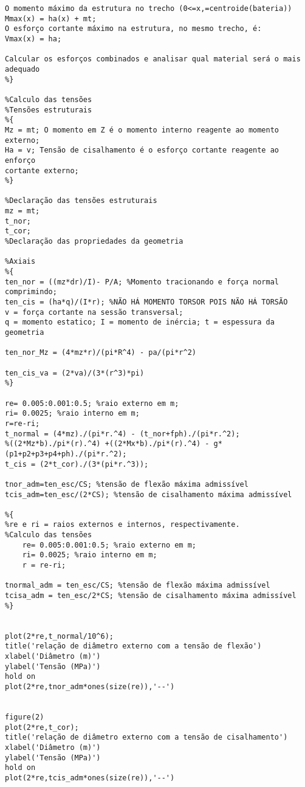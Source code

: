 \begin{anexosenv}
\begin{lstlisting}
O momento máximo da estrutura no trecho (0<=x,=centroide(bateria))
Mmax(x) = ha(x) + mt;
O esforço cortante máximo na estrutura, no mesmo trecho, é:
Vmax(x) = ha;

Calcular os esforços combinados e analisar qual material será o mais
adequado
%}

%Calculo das tensões
%Tensões estruturais
%{
Mz = mt; O momento em Z é o momento interno reagente ao momento externo;
Ha = v; Tensão de cisalhamento é o esforço cortante reagente ao enforço
cortante externo;
%}

%Declaração das tensões estruturais
mz = mt;
t_nor;
t_cor;
%Declaração das propriedades da geometria

%Axiais 
%{
ten_nor = ((mz*dr)/I)- P/A; %Momento tracionando e força normal comprimindo;
ten_cis = (ha*q)/(I*r); %NÃO HÁ MOMENTO TORSOR POIS NÃO HÁ TORSÃO
v = força cortante na sessão transversal;
q = momento estatico; I = momento de inércia; t = espessura da geometria

ten_nor_Mz = (4*mz*r)/(pi*R^4) - pa/(pi*r^2)

ten_cis_va = (2*va)/(3*(r^3)*pi)
%} 

re= 0.005:0.001:0.5; %raio externo em m;
ri= 0.0025; %raio interno em m;
r=re-ri;
t_normal = (4*mz)./(pi*r.^4) - (t_nor+fph)./(pi*r.^2);
%((2*Mz*b)./pi*(r).^4) +((2*Mx*b)./pi*(r).^4) - g*(p1+p2+p3+p4+ph)./(pi*r.^2);
t_cis = (2*t_cor)./(3*(pi*r.^3));

tnor_adm=ten_esc/CS; %tensão de flexão máxima admissível
tcis_adm=ten_esc/(2*CS); %tensão de cisalhamento máxima admissível

%{
%re e ri = raios externos e internos, respectivamente.
%Calculo das tensões
    re= 0.005:0.001:0.5; %raio externo em m;
    ri= 0.0025; %raio interno em m;
    r = re-ri;

tnormal_adm = ten_esc/CS; %tensão de flexão máxima admissível
tcisa_adm = ten_esc/2*CS; %tensão de cisalhamento máxima admissível
%}


plot(2*re,t_normal/10^6);
title('relação de diâmetro externo com a tensão de flexão')
xlabel('Diâmetro (m)')
ylabel('Tensão (MPa)')
hold on
plot(2*re,tnor_adm*ones(size(re)),'--')


figure(2)
plot(2*re,t_cor);
title('relação de diâmetro externo com a tensão de cisalhamento')
xlabel('Diâmetro (m)')
ylabel('Tensão (MPa)')
hold on
plot(2*re,tcis_adm*ones(size(re)),'--')

            
    \end{lstlisting}
    

\end{anexosenv}

